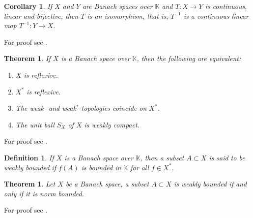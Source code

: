 \documentclass[10pt,twoside,openany,final]{memoir}
\theoremstyle{break}
\newtheorem{theorem}[section]{Theorem}
\newtheorem{corollary}[section]{Corollary}
\newtheorem{definition}[section]{Definition}
\theoremstyle{Break}
\begin{document}
\begin{corollary} \label{cor OMPT}
If $X$ and $Y$ are Banach spaces over $\mathbb{K}$ and $T \colon X \to Y$ is continuous, linear and bijective, then $T$ is an isomorphism, that is, $T^{-1}$ is a continuous linear map $T^{-1} \colon Y \to X$.
\end{corollary}
\noindent For proof see \cite[5.11][162]{folland2013real}.

\begin{theorem} \label{reflexive ball compact}
If $X$ is a Banach space over $\mathbb{K}$, then the following are equivalent:
\begin{enumerate}
\item $X$ is reflexive.
\item $X^*$ is reflexive.
\item The weak- and weak$^*$-topologies coincide on $X^*$.
\item The unit ball $S_{X}$ of $X$ is weakly compact.
\end{enumerate}
\end{theorem}
\noindent For proof see \cite[Theorem 4.2][136]{conway2013course}.

\begin{definition}
If $X$ is a Banach space over $\mathbb{K}$, then a subset $A \subset X$ is said to be weakly bounded if $f(A)$ is bounded in $\mathbb{K}$ for all $f \in X^*$.
\end{definition}

\begin{theorem}\label{weak bounded iff norm}
Let $X$ be a Banach space, a subset $A \subset X$ is weakly bounded if and only if it is norm bounded.
\end{theorem}
\noindent For proof see \cite[Theorem 1.10][130]{conway2013course}.
\end{document}
